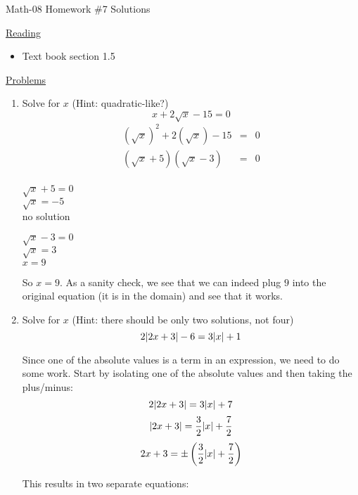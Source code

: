 \documentclass[letterpaper,12pt,fleqn]{article}
\begin{document}
\begin{center}
\Large Math-08 Homework \#7 Solutions
\end{center}

\vspace{0.5in}

\underline{Reading}

\begin{itemize}
\item Text book section 1.5
\end{itemize}

\underline{Problems}

\begin{enumerate}
\item Solve for $x$ (Hint: quadratic-like?)
  \[x+2\sqrt{x}-15=0\]
  \begin{eqnarray*}
    (\sqrt{x})^2+2(\sqrt{x})-15 &=& 0 \\
    (\sqrt{x}+5)(\sqrt{x}-3) &=& 0 \\
  \end{eqnarray*}
  \begin{minipage}[t]{2in}
    $\sqrt{x}+5=0$ \\
    $\sqrt{x}=-5$ \\
    no solution
  \end{minipage}
  \begin{minipage}[t]{2in}
    $\sqrt{x}-3=0$ \\
    $\sqrt{x}=3$ \\
    $x=9$
  \end{minipage}

  \bigskip

  So $x=9$. As a sanity check, we see that we can indeed plug $9$ into the
  original equation (it is in the domain) and see that it works.

  \bigskip

\item Solve for $x$ (Hint: there should be only two solutions, not four)
  \[2\lvert2x+3\rvert-6=3\lvert x\rvert+1\]

  Since one of the absolute values is a term in an expression, we need to do
  some work. Start by isolating one of the absolute values and then taking the
  plus/minus:
  \[2\lvert2x+3\rvert=3\lvert x\rvert+7\]
  \[\lvert2x+3\rvert=\frac{3}{2}\lvert x\rvert+\frac{7}{2}\]
  \[2x+3=\pm\left(\frac{3}{2}\lvert x\rvert+\frac{7}{2}\right)\]
  
  This results in two separate equations:
  

\end{enumerate}
\end{document}
